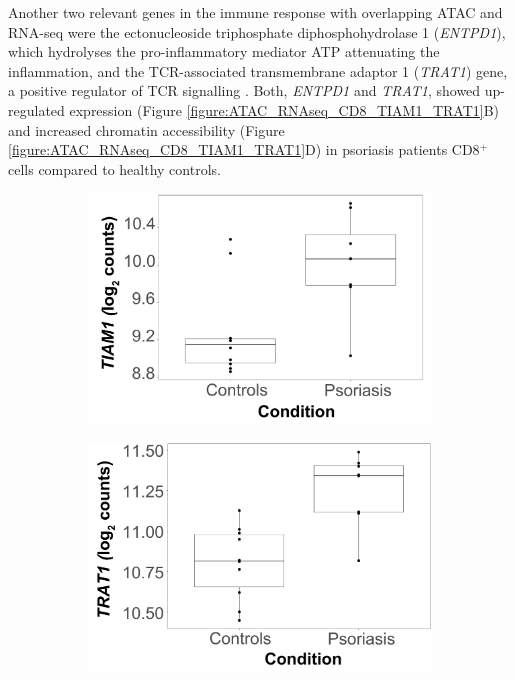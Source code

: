 Another two relevant genes in the immune response with overlapping ATAC and RNA-seq were the ectonucleoside triphosphate diphosphohydrolase 1 (\textit{ENTPD1}), which hydrolyses the pro-inflammatory mediator ATP attenuating the inflammation, and the TCR-associated transmembrane adaptor 1 (\textit{TRAT1}) gene, a positive regulator of TCR signalling \parencite{Antonioli2013, Valk2006}. Both, \textit{ENTPD1} and \textit{TRAT1}, showed up-regulated expression (Figure \ref{figure:ATAC_RNAseq_CD8_TIAM1_TRAT1}B) and increased chromatin accessibility (Figure \ref{figure:ATAC_RNAseq_CD8_TIAM1_TRAT1}D) in psoriasis patients CD8$^+$ cells compared to healthy controls.

\begin{figure}[htbp]
\centering
\begin{subfigure}{0.5\textwidth}
\centering
\includegraphics[width=\textwidth]{./Results2/pdfs/RNAseq_ATAC_TIAM1_boxplot}
\caption{\textbf{}}
\end{subfigure}%
\begin{subfigure}{0.5\textwidth}
\centering
\includegraphics[width=\textwidth]{./Results2/pdfs/RNAseq_ATAC_TRAT1_boxplot}

\end{subfigure}
\end{figure}
